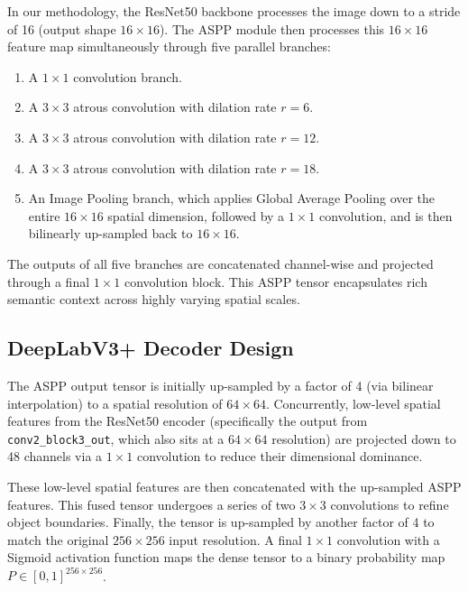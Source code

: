 In our methodology, the ResNet50 backbone processes the image down to a stride of 16 (output shape $16 \times 16$). The ASPP module then processes this $16 \times 16$ feature map simultaneously through five parallel branches:
\begin{enumerate}
    \item A $1 \times 1$ convolution branch.
    \item A $3 \times 3$ atrous convolution with dilation rate $r = 6$.
    \item A $3 \times 3$ atrous convolution with dilation rate $r = 12$.
    \item A $3 \times 3$ atrous convolution with dilation rate $r = 18$.
    \item An Image Pooling branch, which applies Global Average Pooling over the entire $16 \times 16$ spatial dimension, followed by a $1 \times 1$ convolution, and is then bilinearly up-sampled back to $16 \times 16$.
\end{enumerate}
The outputs of all five branches are concatenated channel-wise and projected through a final $1 \times 1$ convolution block. This ASPP tensor encapsulates rich semantic context across highly varying spatial scales.

\subsection{DeepLabV3+ Decoder Design}
The ASPP output tensor is initially up-sampled by a factor of 4 (via bilinear interpolation) to a spatial resolution of $64 \times 64$. Concurrently, low-level spatial features from the ResNet50 encoder (specifically the output from \texttt{conv2\_block3\_out}, which also sits at a $64 \times 64$ resolution) are projected down to 48 channels via a $1 \times 1$ convolution to reduce their dimensional dominance.

These low-level spatial features are then concatenated with the up-sampled ASPP features. This fused tensor undergoes a series of two $3 \times 3$ convolutions to refine object boundaries. Finally, the tensor is up-sampled by another factor of 4 to match the original $256 \times 256$ input resolution. A final $1 \times 1$ convolution with a Sigmoid activation function maps the dense tensor to a binary probability map $P \in [0,1]^{256 \times 256}$.

